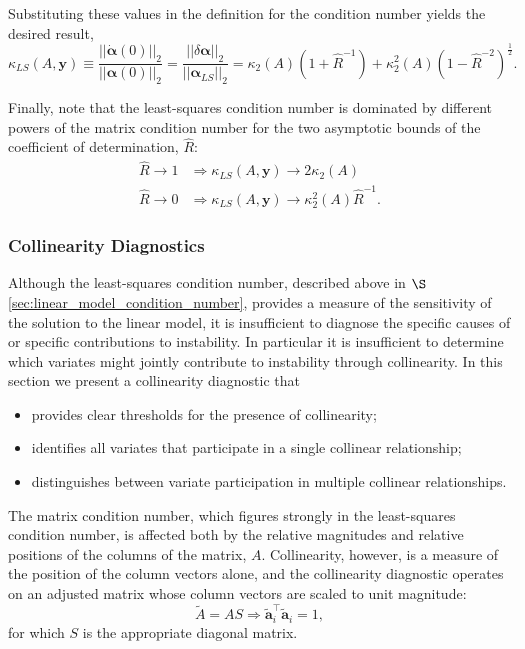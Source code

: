\documentclass[12pt, twoside, draft]{article}
\begin{document}
Substituting these values in the definition for the condition number yields the desired result,
\begin{equation}
\kappa_{LS}(A, \mathbf{y}) \equiv \frac{|| \dot{\boldsymbol{\alpha}}(0) ||_2}{|| \boldsymbol{\alpha}(0) ||_2} = \frac{|| \delta \boldsymbol{\alpha} ||_2}{|| \boldsymbol{\alpha}_{LS} ||_2} = \kappa_2(A) (1  + \hat{R}^{-1}) + \kappa^2_2(A)(1 - \hat{R}^{-2})^{\frac{1}{2}}.
\end{equation}

Finally, note that the least-squares condition number is dominated by different powers of the matrix condition number for the two asymptotic bounds of the coefficient of determination, $\hat{R}$:
\begin{align}
\hat{R} \rightarrow 1 &\Rightarrow \kappa_{LS}(A, \mathbf{y}) \rightarrow 2 \kappa_2(A) \\
\hat{R} \rightarrow 0 &\Rightarrow \kappa_{LS}(A, \mathbf{y}) \rightarrow \kappa_2^2(A) \hat{R}^{-1}.
\end{align}


\subsubsection{Collinearity Diagnostics}\label{sec:Linear_Model_Collinearity_Diagnostics}
Although the least-squares condition number, described above in $\S$\ref{sec:linear_model_condition_number}, provides a measure of the sensitivity of the solution to the linear model, it is insufficient to diagnose the specific causes of or specific contributions to instability.  In particular it is insufficient to determine which variates might jointly contribute to instability through collinearity.  In this section we present a collinearity diagnostic that
\begin{itemize}[noitemsep]
\item provides clear thresholds for the presence of collinearity;
\item identifies all variates that participate in a single collinear relationship;
\item distinguishes between variate participation in multiple collinear relationships.
\end{itemize}

The matrix condition number, which figures strongly in the least-squares condition number, is affected both by the relative magnitudes and relative positions of the columns of the matrix, $A$.  Collinearity, however, is a measure of the position of the column vectors alone, and the collinearity diagnostic operates on an adjusted matrix whose column vectors are scaled to unit magnitude:
\begin{equation}
\tilde{A} = AS \Rightarrow \tilde{\mathbf{a}}_i^\top \tilde{\mathbf{a}}_i = 1,
\end{equation}
for which $S$ is the appropriate diagonal matrix.
\end{document}
